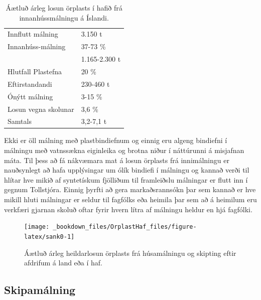 \documentclass[icelandic,]{book}
\begin{document}
\begin{table}[t]

\caption{\label{tab:innimalningartafla}Áætluð árleg losun örplasts í hafið frá innanhússmálningu á Íslandi.}
\centering
\begin{tabular}{ll}
\toprule
Innflutt málning & 3.150 t\\
\addlinespace
\rowcolor{gray!6} Innanhúss-málning & 37-73 \%\\
\rowcolor{gray!6}  & 1.165-2.300 t\\
\addlinespace
Hlutfall Plastefna & 20 \%\\
Eftirstandandi & 230-460 t\\
\addlinespace
\rowcolor{gray!6} Ónýtt málning & 3-15 \%\\
\rowcolor{gray!6}  Losun vegna skolunar & 3,6 \%\\
\addlinespace
Samtals & 3,2-7,1 t \\
\bottomrule
\end{tabular}
\end{table}


Ekki er öll málning með plastbindiefnum og einnig eru algeng bindiefni í málningu með vatnssækna eiginleika og brotna niður í náttúrunni á misjafnan máta. Til þess að fá nákvæmara mat á losun örplasts frá innimálningu er nauðsynlegt að hafa upplýsingar um ólík bindiefi í málningu og kannað verði til hlítar hve mikið af syntetískum fjölliðum til framleiðslu málningar er flutt inn í gegnum Tollstjóra. Einnig þyrfti að gera markaðsrannsókn þar sem kannað er hve mikill hluti málningar er seldur til fagfólks eða heimila þar sem að á heimilum eru verkfæri gjarnan skoluð oftar fyrir hvern lítra af málningu heldur en hjá fagfólki.

\begin{figure}[H]

{\centering \texttt{[image: \_bookdown\_files/OrplastHaf\_files/figure-latex/sank0-1]} 

}

\caption{Áætluð árleg heildarlosun örplasts frá húsamálningu og skipting eftir afdrifum á land eða í haf.}\label{fig:unnamed-chunk-8}
\end{figure}

\hypertarget{skipamalning}{%
\subsection*{Skipamálning}\label{skipamalning}}
\end{document}
